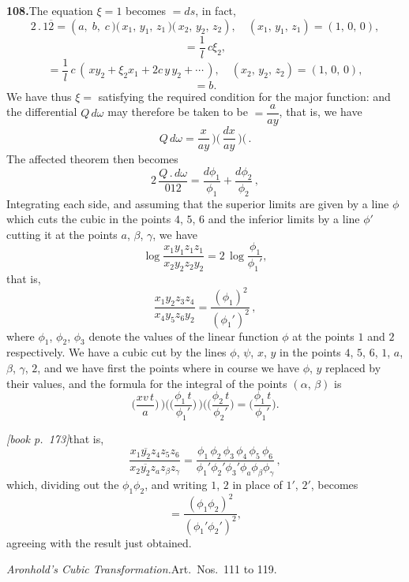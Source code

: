 \documentclass[11pt,a4paper]{article}
\begin{document}
\medskip\noindent\textbf{108.}\quad The equation $\xi = 1$ becomes $= ds$, in fact,
\[
2\,.\,1\overline{2} = (a,\;b,\;c\,\mbox{$)\!($}\,x_1,\,y_1,\,z_1\,\mbox{$)\!($}\,x_2,\,y_2,\,z_2),\quad (x_1,\,y_1,\,z_1) = (1,\,0,\,0),
\]
\[
= \frac{1}{l}\,c\xi_2,
\]
\[
= \frac{1}{l}\,c\,(\,xy_2 + \xi_2 x_1 + 2c\,y\,y_2 + \cdots\,),\quad (x_2,\,y_2,\,z_2) = (1,\,0,\,0),
\]
\[
= b.
\]
We have thus $\xi = $ satisfying the required condition for the major function: and the differential $Q\,d\omega$ may therefore be taken to be $= \dfrac{a}{ay}$, that is, we have
\[
Q\,d\omega = \dfrac{x}{ay}\!\,\mbox{$)\!($}\,\dfrac{dx}{ay}\!\,\mbox{$)\!($}\,.
\]
The affected theorem then becomes
\[
2\,\dfrac{Q\,.\,d\omega}{012} = \dfrac{d\phi_1}{\phi_1} + \dfrac{d\phi_2}{\phi_2}\,,
\]
Integrating each side, and assuming that the superior limits are given by a line $\phi$ which cuts the cubic in the points $4$, $5$, $6$ and the inferior limits by a line $\phi'$ cutting it at the points $a$, $\beta$, $\gamma$, we have
\[
\log\dfrac{x_1y_1z_1z_1}{x_2y_2z_2y_2} = 2\,\log\dfrac{\phi_1}{\phi_1'},
\]
that is,
\[
\dfrac{x_1y_2z_3z_4}{x_4y_5z_6y_2} = \dfrac{(\phi_1)^2}{(\phi_1')^2}\,,
\]
where $\phi_1$, $\phi_2$, $\phi_3$ denote the values of the linear function $\phi$ at the points $1$ and $2$ respectively. We have a cubic cut by the lines $\phi$, $\psi$, $x$, $y$ in the points $4$, $5$, $6$, $1$, $a$, $\beta$, $\gamma$, $2$, and we have first the points where in course we have $\phi$, $y$ replaced by their values, and the formula for the integral of the points $(\alpha,\,\beta)$ is
\[
\bigl(\dfrac{xv\,t}{a}\bigr) \!\,\mbox{$)\!($}\!\bigl(\dfrac{\phi_1\,t}{\phi_1'}\bigr) \!\,\mbox{$)\!($}\!\bigl(\dfrac{\phi_2\,t}{\phi_2'}\bigr) = \!\bigl(\dfrac{\phi_1\,t}{\phi_1'}\bigr).
\]

\medskip\noindent\textit{[book p.~173]}\quad that is,
\[
\dfrac{x_1\overline{y_2} z_4 z_5 z_6}{x_2 \overline{y_2} z_a z_\beta z_\gamma} = \dfrac{\phi_1\,\phi_2\,\phi_3\,\phi_4\,\phi_5\,\phi_6}{\phi_1'\phi_2'\phi_3'\phi_a\phi_\beta\phi_\gamma}\,,
\]
which, dividing out the $\phi_1\phi_2$, and writing $1$, $2$ in place of $1'$, $2'$, becomes
\[
= \dfrac{(\phi_1\phi_2)^2}{(\phi_1'\phi_2')^2},
\]
agreeing with the result just obtained.

\medskip\noindent\textit{Aronhold's Cubic Transformation.}\quad Art.\ Nos.\ 111 to 119.
\end{document}
